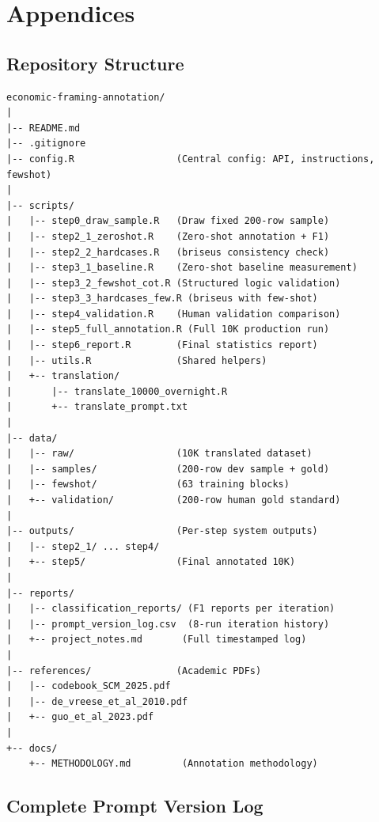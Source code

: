 ﻿%
\appendix
\section*{Appendices}

\renewcommand{\thesubsection}{\Alph{subsection}}

\subsection{Repository Structure}
\label{app:repository}

\begin{lstlisting}[language={},caption={Complete Repository Structure}]
economic-framing-annotation/
|
|-- README.md
|-- .gitignore
|-- config.R                  (Central config: API, instructions, fewshot)
|
|-- scripts/
|   |-- step0_draw_sample.R   (Draw fixed 200-row sample)
|   |-- step2_1_zeroshot.R    (Zero-shot annotation + F1)
|   |-- step2_2_hardcases.R   (briseus consistency check)
|   |-- step3_1_baseline.R    (Zero-shot baseline measurement)
|   |-- step3_2_fewshot_cot.R (Structured logic validation)
|   |-- step3_3_hardcases_few.R (briseus with few-shot)
|   |-- step4_validation.R    (Human validation comparison)
|   |-- step5_full_annotation.R (Full 10K production run)
|   |-- step6_report.R        (Final statistics report)
|   |-- utils.R               (Shared helpers)
|   +-- translation/
|       |-- translate_10000_overnight.R
|       +-- translate_prompt.txt
|
|-- data/
|   |-- raw/                  (10K translated dataset)
|   |-- samples/              (200-row dev sample + gold)
|   |-- fewshot/              (63 training blocks)
|   +-- validation/           (200-row human gold standard)
|
|-- outputs/                  (Per-step system outputs)
|   |-- step2_1/ ... step4/
|   +-- step5/                (Final annotated 10K)
|
|-- reports/
|   |-- classification_reports/ (F1 reports per iteration)
|   |-- prompt_version_log.csv  (8-run iteration history)
|   +-- project_notes.md       (Full timestamped log)
|
|-- references/               (Academic PDFs)
|   |-- codebook_SCM_2025.pdf
|   |-- de_vreese_et_al_2010.pdf
|   +-- guo_et_al_2023.pdf
|
+-- docs/
    +-- METHODOLOGY.md         (Annotation methodology)
\end{lstlisting}

\subsection{Complete Prompt Version Log}
\label{app:prompt_log}

